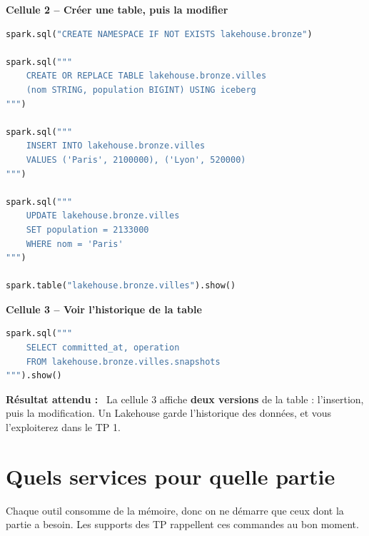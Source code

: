 \documentclass[11pt,a4paper]{article}
\newenvironment{resultat}{\par\medskip\noindent\textbf{Résultat attendu :}\ }{\par\medskip}
\begin{document}
\textbf{Cellule 2 -- Créer une table, puis la modifier}
\begin{lstlisting}[language=Python]
spark.sql("CREATE NAMESPACE IF NOT EXISTS lakehouse.bronze")

spark.sql("""
    CREATE OR REPLACE TABLE lakehouse.bronze.villes
    (nom STRING, population BIGINT) USING iceberg
""")

spark.sql("""
    INSERT INTO lakehouse.bronze.villes
    VALUES ('Paris', 2100000), ('Lyon', 520000)
""")

spark.sql("""
    UPDATE lakehouse.bronze.villes
    SET population = 2133000
    WHERE nom = 'Paris'
""")

spark.table("lakehouse.bronze.villes").show()
\end{lstlisting}

\textbf{Cellule 3 -- Voir l'historique de la table}
\begin{lstlisting}[language=Python]
spark.sql("""
    SELECT committed_at, operation
    FROM lakehouse.bronze.villes.snapshots
""").show()
\end{lstlisting}

\begin{resultat}
La cellule 3 affiche \textbf{deux versions} de la table : l'insertion, puis la modification.
Un Lakehouse garde l'historique des données, et vous l'exploiterez dans le TP 1.
\end{resultat}

\section{Quels services pour quelle partie}\label{sec:services}

Chaque outil consomme de la mémoire, donc on ne démarre que ceux dont la partie a besoin. Les
supports des TP rappellent ces commandes au bon moment.
\end{document}

